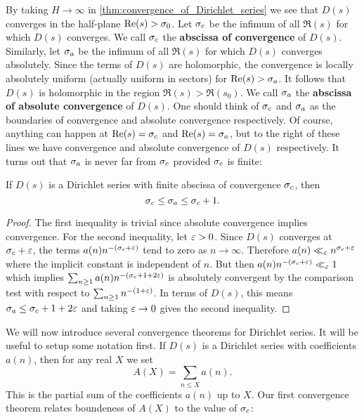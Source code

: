       By taking $H \to \infty$ in \cref{thm:convergence_of_Dirichlet_series} we see that $D(s)$ converges in the half-plane $\mathrm{Re}(s) > \sigma_{0}$. Let $\sigma_{c}$ be the infimum of all $\Re(s)$ for which $D(s)$ converges. We call $\sigma_{c}$ the \textbf{abscissa of convergence} of $D(s)$. Similarly, let $\sigma_{a}$ be the infimum of all $\Re(s)$ for which $D(s)$ converges absolutely. Since the terms of $D(s)$ are holomorphic, the convergence is locally absolutely uniform (actually uniform in sectors) for $\mathrm{Re}(s) > \sigma_{a}$. It follows that $D(s)$ is holomorphic in the region $\Re(s) > \Re(s_{0})$.  We call $\sigma_{a}$ the \textbf{abscissa of absolute convergence} of $D(s)$. One should think of $\sigma_{c}$ and $\sigma_{a}$ as the boundaries of convergence and absolute convergence respectively. Of course, anything can happen at $\mathrm{Re}(s) = \sigma_{c}$ and $\mathrm{Re}(s) = \sigma_{a}$, but to the right of these lines we have convergence and absolute convergence of $D(s)$ respectively. It turns out that $\sigma_{a}$ is never far from $\sigma_{c}$ provided $\sigma_{c}$ is finite:

      \begin{theorem}
        If $D(s)$ is a Dirichlet series with finite abscissa of convergence $\sigma_{c}$, then
        \[
          \sigma_{c} \le \sigma_{a} \le \sigma_{c}+1.
        \]
      \end{theorem}
      \begin{proof}
        The first inequality is trivial since absolute convergence implies convergence. For the second inequality, let $\varepsilon > 0$. Since $D(s)$ converges at $\sigma_{c}+\varepsilon$, the terms $a(n)n^{-(\sigma_{c}+\varepsilon)}$ tend to zero as $n \to \infty$. Therefore $a(n) \ll_{\varepsilon} n^{\sigma_{c}+\varepsilon}$ where the implicit constant is independent of $n$. But then $a(n)n^{-(\sigma_{c}+\varepsilon)} \ll_{\varepsilon} 1$ which implies $\sum_{n \ge 1}a(n)n^{-(\sigma_{c}+1+2\varepsilon)}$ is absolutely convergent by the comparison test with respect to $\sum_{n \ge 1}n^{-(1+\varepsilon)}$. In terms of $D(s)$, this means $\sigma_{a} \le \sigma_{c}+1+2\varepsilon$ and taking $\varepsilon \to 0$ gives the second inequality.
      \end{proof}

      We will now introduce several convergence theorems for Dirichlet series. It will be useful to setup some notation first. If $D(s)$ is a Dirichlet series with coefficients $a(n)$, then for any real $X$ we set
      \[
        A(X) = \sum_{n \le X}a(n).
      \]
      This is the partial sum of the coefficients $a(n)$ up to $X$. Our first convergence theorem relates boundeness of $A(X)$ to the value of $\sigma_{c}$: 
      
